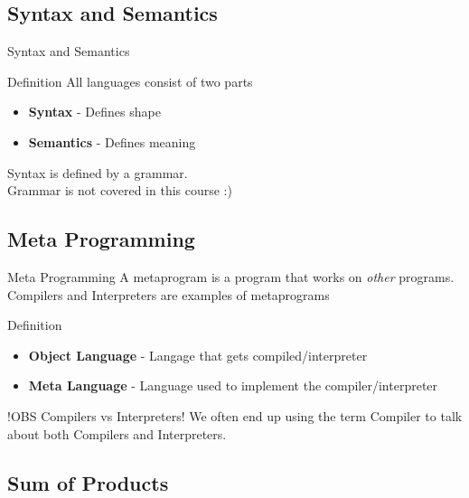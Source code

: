 \subsection{Syntax and Semantics}
\begin{frame}{Syntax and Semantics}
    \begin{block}{Definition}
        All languages consist of two parts
        \begin{itemize}[<+->]
            \item \textbf{Syntax} - Defines shape
            \item \textbf{Semantics} - Defines meaning
        \end{itemize}
    \end{block}
    \Large
    Syntax is defined by a grammar.\\
    Grammar is not covered in this course :)
\end{frame}


\subsection{Meta Programming}
\begin{frame}{Meta Programming}
    A metaprogram is a program that works on \textit{other} programs.\\
    Compilers and Interpreters are examples of metaprograms
    \begin{block}{Definition}
        \begin{itemize}
            \item \textbf{Object Language} - Langage that gets compiled/interpreter
            \item \textbf{Meta Language} - Language used to implement the compiler/interpreter
        \end{itemize}
    \end{block}

    \begin{alertblock}{!OBS Compilers vs Interpreters!}
        We often end up using the term Compiler to talk about both Compilers and Interpreters.
    \end{alertblock}
\end{frame}

\subsection{Sum of Products}

